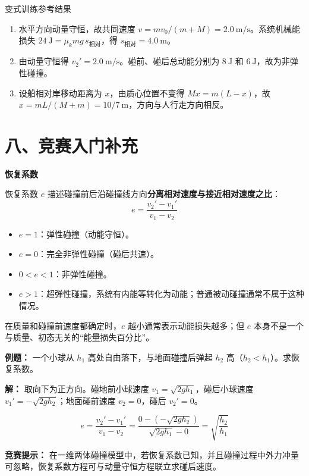 \begin{learningbox}{变式训练参考结果}
\begin{enumerate}[itemsep=0.45em,topsep=0.3em,parsep=0pt]
  \item 水平方向动量守恒，故共同速度
  $v=mv_0/(m+M)=2.0\ \mathrm{m/s}$。系统机械能损失
  $24\ \mathrm J=\mu_kmg\,s_{\text{相对}}$，得
  $s_{\text{相对}}=4.0\ \mathrm m$。
  \item 由动量守恒得 $v_2'=2.0\ \mathrm{m/s}$。碰前、碰后总动能分别为
  $8\ \mathrm J$ 和 $6\ \mathrm J$，故为非弹性碰撞。
  \item 设船相对岸移动距离为 $x$，由质心位置不变得
  $Mx=m(L-x)$，故 $x=mL/(M+m)=10/7\ \mathrm m$，方向与人行走方向相反。
\end{enumerate}
\end{learningbox}

\section*{八、竞赛入门补充}

\begin{competitionbox}
\textbf{恢复系数}

恢复系数 $e$ 描述碰撞前后沿碰撞线方向\textbf{分离相对速度与接近相对速度之比}：
\[
e = \frac{v_2' - v_1'}{v_1 - v_2}
\]

\begin{itemize}[nosep]
  \item $e = 1$：弹性碰撞（动能守恒）。
  \item $e = 0$：完全非弹性碰撞（碰后共速）。
  \item $0 < e < 1$：非弹性碰撞。
  \item $e > 1$：超弹性碰撞，系统有内能等转化为动能；普通被动碰撞通常不属于这种情况。
\end{itemize}

在质量和碰撞前速度都确定时，$e$ 越小通常表示动能损失越多；但 $e$ 本身不是一个与质量、初态无关的“能量损失百分比”。

\textbf{例题：} 一个小球从 $h_1$ 高处自由落下，与地面碰撞后弹起 $h_2$ 高（$h_2 < h_1$）。求恢复系数。

\begin{center}

\end{center}

\textbf{解：} 取向下为正方向。碰地前小球速度 $v_1 = \sqrt{2gh_1}$，碰后小球速度 $v_1' = -\sqrt{2gh_2}$；地面碰前速度 $v_2=0$，碰后 $v_2'=0$。

\[
e = \frac{v_2' - v_1'}{v_1 - v_2} = \frac{0 - (-\sqrt{2gh_2})}{\sqrt{2gh_1} - 0} = \sqrt{\frac{h_2}{h_1}}
\]

\textbf{竞赛提示：} 在一维两体碰撞模型中，若恢复系数已知，并且碰撞过程中外力冲量可忽略，恢复系数方程可与动量守恒方程联立求碰后速度。
\end{competitionbox}

